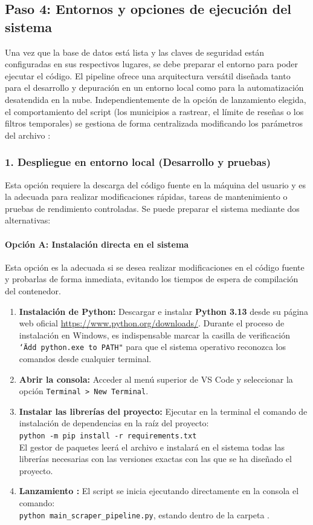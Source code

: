 \subsection{Paso 4: Entornos y opciones de ejecución del sistema}
Una vez que la base de datos está lista y las claves de seguridad están configuradas en sus respectivos lugares, se debe preparar el entorno para poder ejecutar el código. El pipeline ofrece una arquitectura versátil diseñada tanto para el desarrollo y depuración en un entorno local como para la automatización desatendida en la nube. Independientemente de la opción de lanzamiento elegida, el comportamiento del script (los municipios a rastrear, el límite de reseñas o los filtros temporales) se gestiona de forma centralizada modificando los parámetros del archivo :

\subsubsection{1. Despliegue en entorno local (Desarrollo y pruebas)}
Esta opción requiere la descarga del código fuente en la máquina del usuario y es la adecuada para realizar modificaciones rápidas, tareas de mantenimiento o pruebas de rendimiento controladas. Se puede preparar el sistema mediante dos alternativas:

\paragraph{Opción A: Instalación directa en el sistema}
Esta opción es la adecuada si se desea realizar modificaciones en el código fuente y probarlas de forma inmediata, evitando los tiempos de espera de compilación del contenedor.
\begin{enumerate}
    \item \textbf{Instalación de Python:} Descargar e instalar \textbf{Python 3.13} desde su página web oficial \url{https://www.python.org/downloads/}. Durante el proceso de instalación en Windows, es indispensable marcar la casilla de verificación \texttt{\char`\"Add python.exe to PATH"} para que el sistema operativo reconozca los comandos desde cualquier terminal.
    \item \textbf{Abrir la consola:} Acceder al menú superior de VS Code y seleccionar la opción \texttt{Terminal > New Terminal}.
    \item \textbf{Instalar las librerías del proyecto:} Ejecutar en la terminal el comando de instalación de dependencias en la raíz del proyecto: \\
    \texttt{python -m pip install -r requirements.txt} \\
    El gestor de paquetes leerá el archivo e instalará en el sistema todas las librerías necesarias con las versiones exactas con las que se ha diseñado el proyecto.
    \item \textbf{Lanzamiento :} El script se inicia ejecutando directamente en la consola el comando: \\ 
    \texttt{python main\_scraper\_pipeline.py}, estando dentro de la carpeta .
\end{enumerate}


